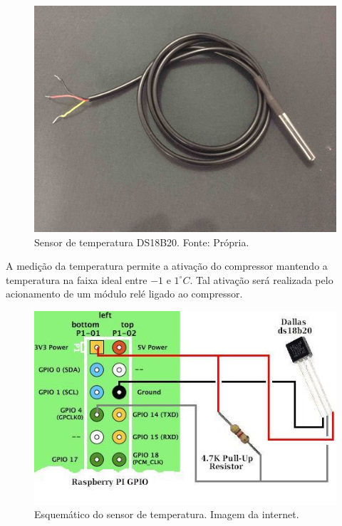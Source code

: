 \begin{figure}[!htb]
            \centering
         	\includegraphics[scale= 0.08]{figuras/temperatura.jpg}
            \caption{Sensor de temperatura DS18B20. Fonte: Própria.}
            \label{sensor-temperatura}
\end{figure}
               
A medição da temperatura permite a ativação do compressor mantendo a temperatura na faixa
ideal entre $-1$ e $1 ^\circ C$. Tal ativação será realizada pelo acionamento de um módulo relé  
ligado ao compressor. 
    
\begin{figure}[!htb]
           \centering
           \includegraphics[scale= 0.5]{figuras/esquema.jpg}
            \caption{Esquemático do sensor de temperatura. Imagem da internet.}
            \label{esquema-temperatura}
\end{figure}    
    

